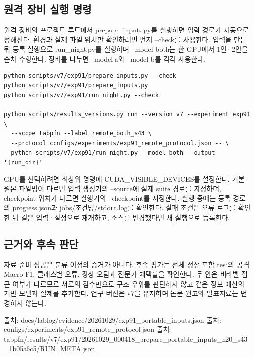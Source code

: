 \subsection{원격 장비 실행 명령}
원격 장비의 프로젝트 루트에서 prepare\_\allowbreak{}inputs.py를 실행하면 입력 경로가 자동으로 정해진다. 환경과 실제 파일 위치만 확인하려면 먼저 --check를 사용한다. 입력을 만든 뒤 등록 실행으로 run\_\allowbreak{}night.py를 실행하며 --model both는 한 GPU에서 1안·2안을 순차 수행한다. 장비를 나누면 --model a와 --model b를 각각 사용한다.


\begin{Verbatim}[breaklines=true,breakanywhere=true,fontsize=\scriptsize]
python scripts/v7/exp91/prepare_inputs.py --check
python scripts/v7/exp91/prepare_inputs.py
python scripts/v7/exp91/run_night.py --check

python scripts/results_versions.py run --version v7 --experiment exp91 \
  --scope tabpfn --label remote_both_s43 \
  --protocol configs/experiments/exp91_remote_protocol.json -- \
  python scripts/v7/exp91/run_night.py --model both --output '{run_dir}'

\end{Verbatim}
GPU를 선택하려면 최상위 명령에 CUDA\_\allowbreak{}VISIBLE\_\allowbreak{}DEVICES를 설정한다. 기본 원본 파일명이 다르면 입력 생성기의 --source에 실제 suite 경로를 지정하며, checkpoint 위치가 다르면 실행기의 --checkpoint를 지정한다. 실행 중에는 등록 경로의 progress.json과 jobs/\allowbreak{}조건명/\allowbreak{}stdout.log를 확인한다. 실패 조건은 오류 로그를 확인한 뒤 같은 입력·설정으로 재개하고, 소스를 변경했다면 새 실행으로 등록한다.

\subsection{근거와 후속 판단}
자료 준비 성공은 분류 이점의 증거가 아니다. 후속 평가는 전체 정상 포함 test의 공격 Macro-F1, 클래스별 오류, 정상 오탐과 전문가 채택률을 확인한다. 두 안은 비라벨 접근 여부가 다르므로 서로의 점수만으로 구조 우위를 판단하지 않고 같은 정보 예산의 기반 모델과 절제를 추가한다. 연구 버전은 v7을 유지하며 논문 원고와 발표자료는 변경하지 않는다.

출처: docs/\allowbreak{}lablog/\allowbreak{}evidence/\allowbreak{}20261029/\allowbreak{}exp91\_\allowbreak{}portable\_\allowbreak{}inputs.json 출처: configs/\allowbreak{}experiments/\allowbreak{}exp91\_\allowbreak{}remote\_\allowbreak{}protocol.json 출처: tabpfn/\allowbreak{}results/\allowbreak{}v7/\allowbreak{}exp91/\allowbreak{}20261029\_\allowbreak{}000418\_\allowbreak{}prepare\_\allowbreak{}portable\_\allowbreak{}inputs\_\allowbreak{}n20\_\allowbreak{}s43\_\allowbreak{}1b05a5c5/\allowbreak{}RUN\_\allowbreak{}META.json


